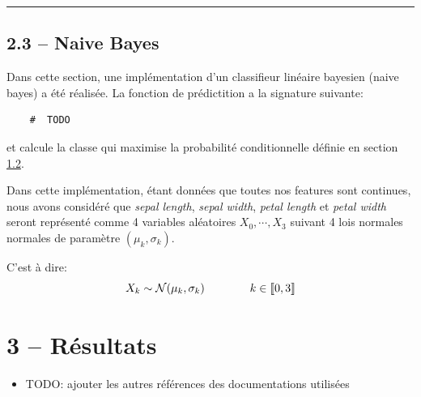 \documentclass[
]{article}
\providecommand{\tightlist}{%
  \setlength{\itemsep}{0pt}\setlength{\parskip}{0pt}}
\begin{document}
\begin{center}\rule{0.5\linewidth}{0.5pt}\end{center}

\newpage{}

\hypertarget{naive-bayes-1}{%
\subsection{2.3 -- Naive Bayes}\label{naive-bayes-1}}

Dans cette section, une implémentation d'un classifieur linéaire
bayesien (naive bayes) a été réalisée. La fonction de prédictition a la
signature suivante:

\begin{lstlisting}
    #  TODO
\end{lstlisting}

et calcule la classe qui maximise la probabilité conditionnelle définie
en section \href{#naive-bayes}{1.2}.

Dans cette implémentation, étant données que toutes nos features sont
continues, nous avons considéré que \emph{sepal length}, \emph{sepal
width}, \emph{petal length} et \emph{petal width} seront représenté
comme 4 variables aléatoires \(X_0, \cdots, X_3\) suivant 4 lois
normales normales de paramètre \((\mu_k, \sigma_k)\).

C'est à dire: \[
X_k \sim \mathcal{N}( \mu_k, \sigma_k) \qquad \qquad k \in \llbracket{0, 3}\rrbracket
\]

\newpage{}

\hypertarget{ruxe9sultats}{%
\section{3 -- Résultats}\label{ruxe9sultats}}

\printbibliography[heading=bibintoc, title={Références}]

\begin{itemize}
\tightlist
\item
  TODO: ajouter les autres références des documentations utilisées
\end{itemize}
\end{document}
